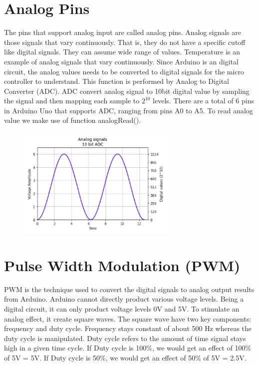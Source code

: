 \section{Analog Pins}
The pins that support analog input are called analog pins. Analog signals are those signals that vary continuously. That is, they do not have a specific cutoff like digital signals. They can assume wide range of values. Temperature is an example of analog signals that vary continuously. Since Arduino is an digital circuit, the analog values needs to be converted to digital signals for the micro controller to understand. This function is performed by Analog to Digital Converter (ADC). ADC convert analog signal to 10bit digital value by sampling the signal and then mapping each sample to $2^{10}$ levels. There are a total of 6 pins in Arduino Uno that supports ADC, ranging from pins A0 to A5. To read analog value we make use of function analogRead().
\begin{figure}
 \centering
 \includegraphics[width=3in]{Chapters/images/plot.png}
\end{figure}

\section{Pulse Width Modulation (PWM)}
PWM is the technique used to convert the digital signals to analog output results from Arduino. Arduino cannot directly product various voltage levels. Being a digital circuit, it can only product voltage levels 0V and 5V. To stimulate an analog effect, it create square waves. The square wave have two key components: frequency and duty cycle. Frequency stays constant of about 500 Hz whereas the duty cycle is manipulated. Duty cycle refers to the amount of time signal stays high in a given time cycle. If Duty cycle is 100\%, we would get an effect of 100\% of 5V = 5V. If Duty cycle is 50\%, we would get an effect of 50\% of 5V = 2.5V. \\

